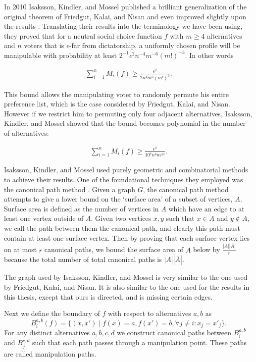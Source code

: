 	In 2010 Isaksson, Kindler, and Mossel published a brilliant generalization of the original theorem of Friedgut, Kalai, and Nisan and even improved slightly upon the results \cite{isaksson2010geometry}. Translating their results into the terminology we have been using, they proved that for a neutral social choice function $f$ with $m \ge 4$ alternatives and $n$ voters that is $\epsilon$-far from dictatorship, a uniformly chosen profile will be manipulable with probability at least $2^{-1} \epsilon^2 n^{-4} m^{-6} (m!)^{-3}$. In other words

	\begin{align*}
		\sum_{i=1}^n M_i(f) \ge \frac{\epsilon^2}{2 n^4 m^6 (m!)^3}.
	\end{align*}

	This bound allows the manipulating voter to randomly permute his entire preference list, which is the case considered by Friedgut, Kalai, and Nisan. However if we restrict him to permuting only four adjacent alternatives, Isaksson, Kindler, and Mossel showed that the bound becomes polynomial in the number of alternatives:

	\begin{align*}
		\sum_{i=1}^n M_i(f) \ge \frac{\epsilon^2}{10^4 n^3 m^{30}}.
	\end{align*}

	Isaksson, Kindler, and Mossel used purely geometric and combinatorial methods to achieve their results. One of the foundational techniques they employed was the canonical path method \cite{jerrum1993polynomial}. Given a graph $G$, the canonical path method attempts to give a lower bound on the `surface area' of a subset of vertices, $A$. Surface area is defined as the number of vertices in $A$ which have an edge to at least one vertex outside of $A$. Given two vertices $x, y$ such that $x \in A$ and $y \notin A$, we call the path between them the canonical path, and clearly this path must contain at least one surface vertex. Then by proving that each surface vertex lies on at most $r$ canonical paths, we bound the surface area of $A$ below by $\frac{|A| |\overline{A}|}{r}$ because the total number of total canonical paths is $|A| |\overline{A}|$.

	The graph used by Isaksson, Kindler, and Mossel is very similar to the one used by Friedgut, Kalai, and Nisan. It is also similar to the one used for the results in this thesis, except that ours is directed, and is missing certain edges.

	Next we define the boundary of $f$ with respect to alternatives $a, b$ as
	\[
		B^{a,b}_i(f) = \{(x, x') \mid f(x) = a, f(x') = b, \forall j \neq i: x_j = x'_j\}.
	\]
	For any distinct alternatives $a, b, c, d$ we construct canonical paths between $B^{a,b}_i$ and $B^{c,d}_j$ such that each path passes through a manipulation point. These paths are called manipulation paths.

